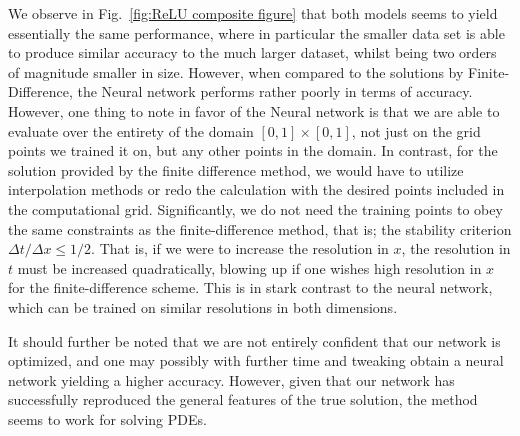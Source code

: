 \documentclass[reprint, english, nofootinbib]{revtex4-2}
\begin{document}
We observe in Fig.~\ref{fig:ReLU composite figure} that both models seems to yield essentially the same performance, where in particular the smaller data set is able to produce similar accuracy to the much larger dataset, whilst being two orders of magnitude smaller in size. However, when compared to the solutions by Finite-Difference, the Neural network performs rather poorly in terms of accuracy. However, one thing to note in favor of the Neural network is that we are able to evaluate over the entirety of the domain $[0,1]\times[0,1]$, not just on the grid points we trained it on, but any other points in the domain. In contrast, for the solution provided by the finite difference method, we would have to utilize interpolation methods or redo the calculation with the desired points included in the computational grid. Significantly, we do not need the training points to obey the same constraints as the finite-difference method, that is; the stability criterion $\Delta t / \Delta x \leq 1/2$. That is, if we were to increase the resolution in $x$, the resolution in $t$ must be increased quadratically, blowing up if one wishes high resolution in $x$ for the finite-difference scheme. This is in stark contrast to the neural network, which can be trained on similar resolutions in both dimensions.

It should further be noted that we are not entirely confident that our network is optimized, and one may possibly with further time and tweaking obtain a neural network yielding a higher accuracy. However, given that our network has successfully reproduced the general features of the true solution, the method seems to work for solving PDEs. 

\end{document}
